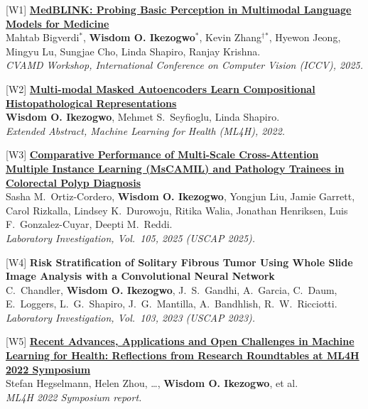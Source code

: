 \documentclass[10pt,letterpaper]{article}
\newcommand{\cvsub}[1]{\vspace{1.5mm}{\scshape\bfseries #1}\par\vspace{0.5mm}}
\newcommand{\ptitle}[2]{{\bfseries\color{linkc}\href{#1}{#2}}}
\newcommand{\me}{\textbf{Wisdom O. Ikezogwo}}
\newcommand{\mt}[1]{#1$^\dagger$}   %
\newcommand{\venue}[1]{\textit{#1}}
\begin{document}
\cvsub{Workshop Papers, Abstracts \& Reports}
\begin{pubs}
  \item[{[W1]}] \ptitle{https://arxiv.org/abs/2508.02951}{MedBLINK: Probing Basic Perception in Multimodal Language Models for Medicine}\\
  Mahtab Bigverdi$^*$, \me$^*$, \mt{Kevin Zhang}$^*$, Hyewon Jeong, Mingyu Lu, Sungjae Cho, Linda Shapiro, Ranjay Krishna.\\
  \venue{CVAMD Workshop, International Conference on Computer Vision (ICCV), 2025.}
  \item[{[W2]}] \ptitle{https://arxiv.org/abs/2209.01534}{Multi-modal Masked Autoencoders Learn Compositional Histopathological Representations}\\
  \me, Mehmet S.\ Seyfioglu, Linda Shapiro.\\
  \venue{Extended Abstract, Machine Learning for Health (ML4H), 2022.}
  \item[{[W3]}] \ptitle{https://www.laboratoryinvestigation.org/article/S0023-6837(24)02407-3/fulltext}{Comparative Performance of Multi-Scale Cross-Attention Multiple Instance Learning (MsCAMIL) and Pathology Trainees in Colorectal Polyp Diagnosis}\\
  Sasha M.\ Ortiz-Cordero, \me, Yongjun Liu, Jamie Garrett, Carol Rizkalla, Lindsey K.\ Durowoju, Ritika Walia, Jonathan Henriksen, Luis F.\ Gonzalez-Cuyar, Deepti M.\ Reddi.\\
  \venue{Laboratory Investigation, Vol.\ 105, 2025 (USCAP 2025).}
  \item[{[W4]}] {\bfseries\color{linkc} Risk Stratification of Solitary Fibrous Tumor Using Whole Slide Image Analysis with a Convolutional Neural Network}\\
  C.\ Chandler, \me, J.\ S.\ Gandhi, A.\ Garcia, C.\ Daum, E.\ Loggers, L.\ G.\ Shapiro, J.\ G.\ Mantilla, A.\ Bandhlish, R.\ W.\ Ricciotti.\\
  \venue{Laboratory Investigation, Vol.\ 103, 2023 (USCAP 2023).}
  \item[{[W5]}] \ptitle{https://zenodo.org/records/7951122}{Recent Advances, Applications and Open Challenges in Machine Learning for Health: Reflections from Research Roundtables at ML4H 2022 Symposium}\\
  Stefan Hegselmann, Helen Zhou, \dots, \me, et al.\\
  \venue{ML4H 2022 Symposium report.}
\end{pubs}
\end{document}
